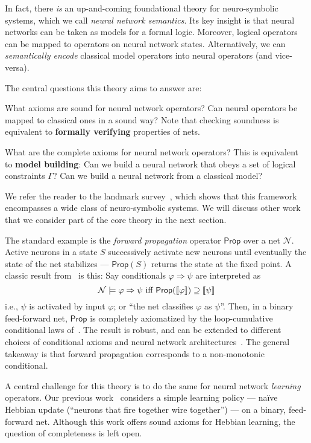\documentclass[letterpaper]{article}
\theoremstyle{definition}
\newcommand{\key}[1]{\emph{#1}}
\newcommand{\semantics}[1]{[\![\mbox{\em $ #1 $\/}]\!]}
\newcommand{\Net}{\mathcal{N}}
\newcommand{\Prop}{\mathsf{Prop}}
\begin{document}
In fact, there \emph{is} an up-and-coming foundational theory for neuro-symbolic systems, which we call \emph{neural network semantics}.  Its key insight is that neural networks can be taken as models for a formal logic.  Moreover, logical operators can be mapped to operators on neural network states.  Alternatively, we can \emph{semantically encode} classical model operators into neural operators (and vice-versa).

The central questions this theory aims to answer are:
\begin{description}[style=unboxed,leftmargin=2ex]
    \item[Soundness.] What axioms are sound for neural network operators?  Can neural operators be mapped to classical ones in a sound way?  Note that checking soundness is equivalent to \textbf{formally verifying} properties of nets.
     
    \item[Completeness.] What are the complete axioms for neural network operators?  This is equivalent to \textbf{model building}: Can we build a neural network that obeys a set of logical constraints $\Gamma$?  Can we build a neural network from a classical model?
\end{description}
We refer the reader to the landmark survey~\cite{Odense2022ASF}, which shows that this framework encompasses a wide class of neuro-symbolic systems.  We will discuss other work that we consider part of the core theory in the next section.

The standard example is the \key{forward propagation} operator $\Prop$ over a net $\Net$.  Active neurons in a state $S$ successively activate new neurons until eventually the state of the net stabilizes --- $\Prop(S)$ returns the state at the fixed point.  A classic result from~\cite{leitgeb2001nonmonotonic} is this: Say conditionals $\varphi \Rightarrow \psi$ are interpreted as
\[
    \Net \models \varphi \Rightarrow \psi \mbox{ iff } \Prop(\semantics{\varphi}) \supseteq \semantics{\psi}
\]
i.e., $\psi$ is activated by input $\varphi$; or ``the net classifies $\varphi$ as $\psi$''.  Then, in a binary feed-forward net, $\Prop$ is completely axiomatized by the loop-cumulative conditional laws of~\cite{kraus1990nonmonotonic}.  The result is robust, and can be extended to different choices of conditional axioms and neural network architectures~\cite{leitgeb2003nonmonotonic}.  The general takeaway is that forward propagation corresponds to a non-monotonic conditional.

A central challenge for this theory is to do the same for neural network \emph{learning} operators.  Our previous work~\cite{kisby2022logic} considers a simple learning policy --- na\"{i}ve Hebbian update (``neurons that fire together wire together'') --- on a binary, feed-forward net.  Although this work offers sound axioms for Hebbian learning, the question of completeness is left open.
\end{document}
